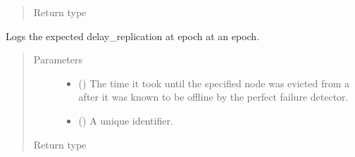\documentclass[letterpaper,10pt,english]{sphinxmanual}
\begin{document}
\begin{fulllineitems}
\begin{fulllineitems}
\begin{quote}
\begin{description}
\item[{Return type}] \leavevmode
{}

\end{description}\end{quote}

\end{fulllineitems}


\begin{fulllineitems}
\label{\detokenize{app.domain.helpers:app.domain.helpers.smart_dataclasses.LoggingData.log_suspicous_node_detection_delay}}
Logs the expected delay\_replication at epoch at an epoch.
\begin{quote}\begin{description}
\item[{Parameters}] \leavevmode\begin{itemize}
\item {} 
 () \textendash{} The time it took until the specified node was evicted from a
{\hyperref[\detokenize{app.domain:module-app.domain.cluster_groups}]{}} after it was known
to be offline by the perfect failure detector.

\item {} 
 () \textendash{} A unique {\hyperref[\detokenize{app.domain:module-app.domain.network_nodes}]{}} identifier.

\end{itemize}

\item[{Return type}] \leavevmode
{}

\end{description}\end{quote}


\end{fulllineitems}
\end{fulllineitems}
\end{document}
